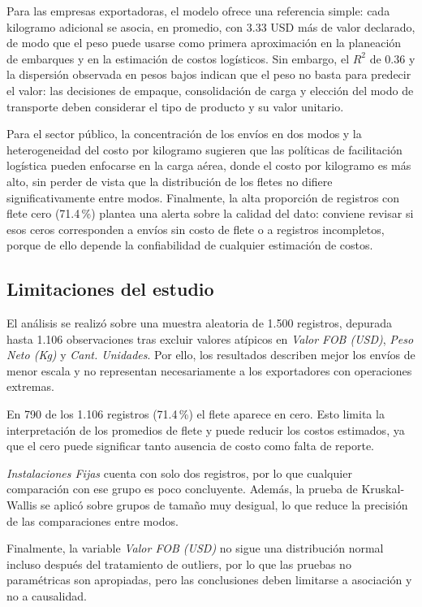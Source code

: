 \documentclass[12pt]{article}
\begin{document}
Para las empresas exportadoras, el modelo ofrece una referencia simple:
cada kilogramo adicional se asocia, en promedio, con 3.33 USD más de
valor declarado, de modo que el peso puede usarse como primera
aproximación en la planeación de embarques y en la estimación de costos
logísticos. Sin embargo, el \(R^2\) de 0.36 y la dispersión observada en
pesos bajos indican que el peso no basta para predecir el valor: las
decisiones de empaque, consolidación de carga y elección del modo de
transporte deben considerar el tipo de producto y su valor unitario.

Para el sector público, la concentración de los envíos en dos modos y
la heterogeneidad del costo por kilogramo sugieren que las políticas de
facilitación logística pueden enfocarse en la carga aérea, donde el
costo por kilogramo es más alto, sin perder de vista que la
distribución de los fletes no difiere significativamente entre modos.
Finalmente, la alta proporción de registros con flete cero (71.4\,\%)
plantea una alerta sobre la calidad del dato: conviene revisar si esos
ceros corresponden a envíos sin costo de flete o a registros
incompletos, porque de ello depende la confiabilidad de cualquier
estimación de costos.

\subsection{Limitaciones del estudio}

El análisis se realizó sobre una muestra aleatoria de 1.500 registros,
depurada hasta 1.106 observaciones tras excluir valores atípicos en
\emph{Valor FOB (USD)}, \emph{Peso Neto (Kg)} y \emph{Cant. Unidades}.
Por ello, los resultados describen mejor los envíos de menor escala y
no representan necesariamente a los exportadores con operaciones
extremas.

En 790 de los 1.106 registros (71.4\,\%) el flete aparece en cero.
Esto limita la interpretación de los promedios de flete y puede
reducir los costos estimados, ya que el cero puede significar tanto
ausencia de costo como falta de reporte.

\emph{Instalaciones Fijas} cuenta con solo dos registros, por lo que
cualquier comparación con ese grupo es poco concluyente. Además, la
prueba de Kruskal-Wallis se aplicó sobre grupos de tamaño muy
desigual, lo que reduce la precisión de las comparaciones entre modos.

Finalmente, la variable \emph{Valor FOB (USD)} no sigue una
distribución normal incluso después del tratamiento de outliers, por
lo que las pruebas no paramétricas son apropiadas, pero las
conclusiones deben limitarse a asociación y no a causalidad.
\end{document}
